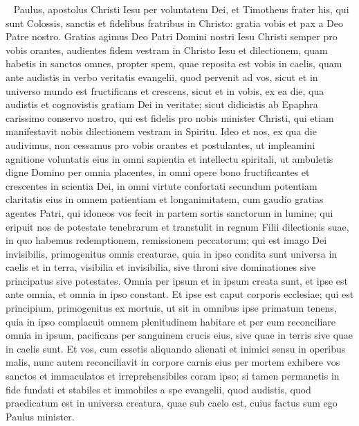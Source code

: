 
\begin{biblechapter}  
\verse Paulus, apostolus Christi Iesu per voluntatem Dei, et Timotheus frater 
\verse his, qui sunt Colossis, sanctis et fidelibus fratribus in Christo: gratia vobis et pax a Deo Patre nostro. 
\verse Gratias agimus Deo Patri Domini nostri Iesu Christi semper pro vobis orantes, 
\verse audientes fidem vestram in Christo Iesu et dilectionem, quam habetis in sanctos omnes, 
\verse propter spem, quae reposita est vobis in caelis, quam ante audistis in verbo veritatis evangelii, 
\verse quod pervenit ad vos, sicut et in universo mundo est fructificans et crescens, sicut et in vobis, ex ea die, qua audistis et cognovistis gratiam Dei in veritate; 
\verse sicut didicistis ab Epaphra carissimo conservo nostro, qui est fidelis pro nobis minister Christi,  
\verse qui etiam manifestavit nobis dilectionem vestram in Spiritu. 
\verse Ideo et nos, ex qua die audivimus, non cessamus pro vobis orantes et postulantes, ut impleamini agnitione voluntatis eius in omni sapientia et intellectu spiritali, 
\verse ut ambuletis digne Domino per omnia placentes, in omni opere bono fructificantes et crescentes in scientia Dei, 
\verse in omni virtute confortati secundum potentiam claritatis eius in omnem patientiam et longanimitatem, cum gaudio 
\verse gratias agentes Patri, qui idoneos vos fecit in partem sortis sanctorum in lumine; 
\verse qui eripuit nos de potestate tenebrarum et transtulit in regnum Filii dilectionis suae, 
\verse in quo habemus redemptionem, remissionem peccatorum; 
\verse qui est imago Dei invisibilis, primogenitus omnis creaturae, 
\verse quia in ipso condita sunt universa in caelis et in terra, visibilia et invisibilia, sive throni sive dominationes sive principatus sive potestates. Omnia per ipsum et in ipsum creata sunt, 
\verse et ipse est ante omnia, et omnia in ipso constant. 
\verse Et ipse est caput corporis ecclesiae; qui est principium, primogenitus ex mortuis, ut sit in omnibus ipse primatum tenens, 
\verse quia in ipso complacuit omnem plenitudinem habitare 
\verse et per eum reconciliare omnia in ipsum, pacificans per sanguinem crucis eius, sive quae in terris sive quae in caelis sunt. 
\verse Et vos, cum essetis aliquando alienati et inimici sensu in operibus malis,  
\verse nunc autem reconciliavit in corpore carnis eius per mortem exhibere vos sanctos et immaculatos et irreprehensibiles coram ipso; 
\verse si tamen permanetis in fide fundati et stabiles et immobiles a spe evangelii, quod audistis, quod praedicatum est in universa creatura, quae sub caelo est, cuius factus sum ego Paulus minister. 

\end{biblechapter}
